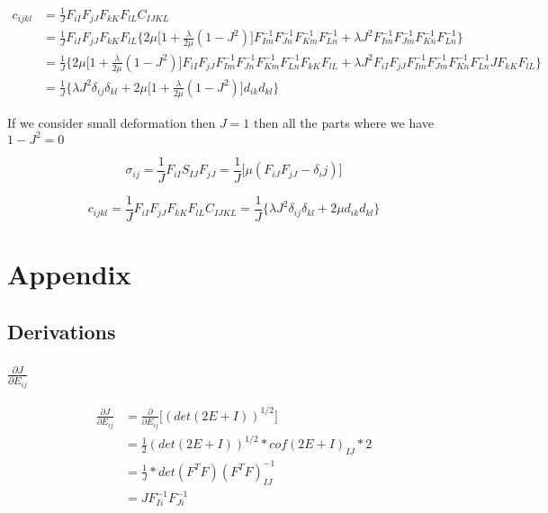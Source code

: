 \documentclass[10pt,a4paper]{article}
\begin{document}
   \begin{equation}
   \begin{split}
   c_{ijkl} &= \frac{1}{J}F_{iI}F_{jJ}F_{kK}F_{lL}C_{IJKL}\\
   &=   \frac{1}{J}F_{iI}F_{jJ}F_{kK}F_{lL}\Big
   \{2\mu \Big[ 1 + \frac{\lambda}{2\mu}(1-J^2)\Big]F^{-1}_{Im}F^{-1}_{Jn}F^{-1}_{Km}F^{-1}_{Ln}+\lambda J^2 F^{-1}_{Im}F^{-1}_{Jm}F^{-1}_{Kn}F^{-1}_{Ln}\Big\}\\
    &=   \frac{1}{J}\Big
   \{2\mu \Big[ 1 + \frac{\lambda}{2\mu}(1-J^2)\Big]F_{iI}F_{jJ}F^{-1}_{Im}F^{-1}_{Jn}F^{-1}_{Km}F^{-1}_{Ln}F_{kK}F_{lL}+\lambda J^2 F_{iI}F_{jJ}F^{-1}_{Im}F^{-1}_{Jm}F^{-1}_{Kn}F^{-1}_{Ln}JF_{kK}F_{lL}\Big\}\\
   &= \frac{1}{J} \Big\{ \lambda J^2\delta_{ij}\delta_{kl}+2\mu \Big[ 1+\frac{\lambda}{2\mu}(1-J^2) \Big]d_{ik}d_{kl} \Big\}
   \end{split}
   \end{equation}
   
   
   If we consider small deformation then $J = 1$ then all the parts where we have $1-J^2 = 0$ 
   
   $$\sigma_{ij} = \frac{1}{J}F_{iI}S_{IJ}F_{jJ}=\frac{1}{J}\Big[ \mu(F_{iJ}F_{jJ}-\delta_{i}j) \Big] $$
   
   $$c_{ijkl} = \frac{1}{J}F_{iI}F_{jJ}F_{kK}F_{lL}C_{IJKL} = \frac{1}{J} \Big\{ \lambda J^2\delta_{ij}\delta_{kl}+2\mu d_{ik}d_{kl} \Big\}$$
   
   
   \section{Appendix}
   \subsection{Derivations}
   \subsubsection{$\frac{\partial J}{\partial E_{ij}}$}
   \begin{equation}
   \begin{split}
      \frac{\partial J}{\partial E_{ij}}  &= \frac{\partial}{\partial E_{ij}} \Big[  (det(2E+I))^{1/2}   \Big] \\ 
      &= \frac{1}{2}(det(2E+I))^{1/2} * cof(2E+I)_{IJ}*2 \\
      &= \frac{1}{J}*det(F^TF)(F^TF)^{-1}_{IJ}\\
      &= JF^{-1}_{Ii}F^{-1}_{Ji}
      \end{split}
   \end{equation}
  
\end{document}
